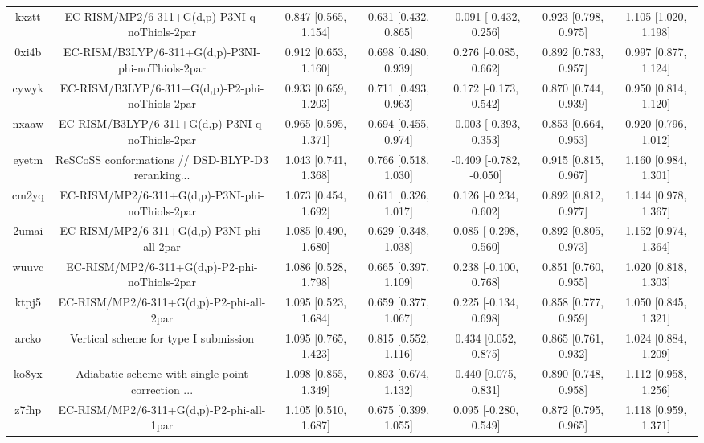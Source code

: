 \documentclass{article}
\begin{document}
\begin{center}
\begin{longtable}{|ccccccc|}
 kxztt &      EC-RISM/MP2/6-311+G(d,p)-P3NI-q-noThiols-2par &  0.847 [0.565, 1.154] &  0.631 [0.432, 0.865] &   -0.091 [-0.432, 0.256] &  0.923 [0.798, 0.975] &   1.105 [1.020, 1.198] \\
 0xi4b &  EC-RISM/B3LYP/6-311+G(d,p)-P3NI-phi-noThiols-2par &  0.912 [0.653, 1.160] &  0.698 [0.480, 0.939] &    0.276 [-0.085, 0.662] &  0.892 [0.783, 0.957] &   0.997 [0.877, 1.124] \\
 cywyk &    EC-RISM/B3LYP/6-311+G(d,p)-P2-phi-noThiols-2par &  0.933 [0.659, 1.203] &  0.711 [0.493, 0.963] &    0.172 [-0.173, 0.542] &  0.870 [0.744, 0.939] &   0.950 [0.814, 1.120] \\
 nxaaw &    EC-RISM/B3LYP/6-311+G(d,p)-P3NI-q-noThiols-2par &  0.965 [0.595, 1.371] &  0.694 [0.455, 0.974] &   -0.003 [-0.393, 0.353] &  0.853 [0.664, 0.953] &   0.920 [0.796, 1.012] \\
 eyetm &  ReSCoSS conformations // DSD-BLYP-D3 reranking... &  1.043 [0.741, 1.368] &  0.766 [0.518, 1.030] &  -0.409 [-0.782, -0.050] &  0.915 [0.815, 0.967] &   1.160 [0.984, 1.301] \\
 cm2yq &    EC-RISM/MP2/6-311+G(d,p)-P3NI-phi-noThiols-2par &  1.073 [0.454, 1.692] &  0.611 [0.326, 1.017] &    0.126 [-0.234, 0.602] &  0.892 [0.812, 0.977] &   1.144 [0.978, 1.367] \\
 2umai &         EC-RISM/MP2/6-311+G(d,p)-P3NI-phi-all-2par &  1.085 [0.490, 1.680] &  0.629 [0.348, 1.038] &    0.085 [-0.298, 0.560] &  0.892 [0.805, 0.973] &   1.152 [0.974, 1.364] \\
 wuuvc &      EC-RISM/MP2/6-311+G(d,p)-P2-phi-noThiols-2par &  1.086 [0.528, 1.798] &  0.665 [0.397, 1.109] &    0.238 [-0.100, 0.768] &  0.851 [0.760, 0.955] &   1.020 [0.818, 1.303] \\
 ktpj5 &           EC-RISM/MP2/6-311+G(d,p)-P2-phi-all-2par &  1.095 [0.523, 1.684] &  0.659 [0.377, 1.067] &    0.225 [-0.134, 0.698] &  0.858 [0.777, 0.959] &   1.050 [0.845, 1.321] \\
 arcko &              Vertical scheme for type I submission &  1.095 [0.765, 1.423] &  0.815 [0.552, 1.116] &     0.434 [0.052, 0.875] &  0.865 [0.761, 0.932] &   1.024 [0.884, 1.209] \\
 ko8yx &  Adiabatic scheme with single point correction ... &  1.098 [0.855, 1.349] &  0.893 [0.674, 1.132] &     0.440 [0.075, 0.831] &  0.890 [0.748, 0.958] &   1.112 [0.958, 1.256] \\
 z7fhp &           EC-RISM/MP2/6-311+G(d,p)-P2-phi-all-1par &  1.105 [0.510, 1.687] &  0.675 [0.399, 1.055] &    0.095 [-0.280, 0.549] &  0.872 [0.795, 0.965] &   1.118 [0.959, 1.371] \\

\end{longtable}
\end{center}
\end{document}
